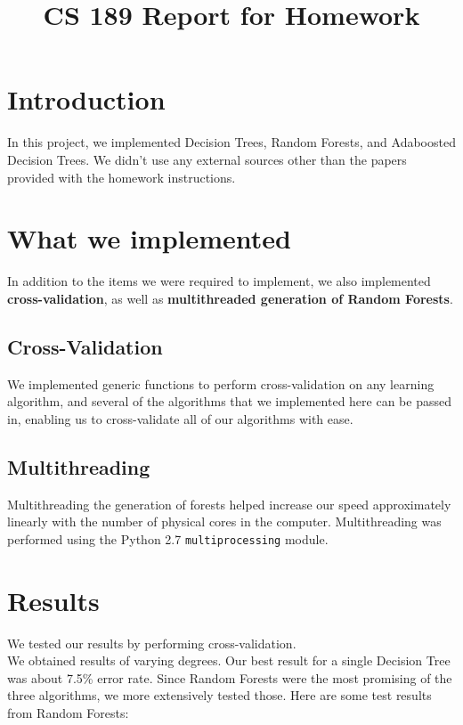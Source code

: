 \documentclass[11pt]{article}
\title{CS 189 Report for Homework \Homework}
\author{\Name}
\begin{document}
\maketitle

\section{Introduction}

In this project, we implemented Decision Trees, Random Forests, and Adaboosted Decision Trees. We didn't use any external sources other than the papers provided with the homework instructions. 

\section{What we implemented}

In addition to the items we were required to implement, we also implemented \textbf{cross-validation}, as well as \textbf{multithreaded generation of Random Forests}. 

\subsection{Cross-Validation}
We implemented generic functions to perform cross-validation on any learning algorithm, and several of the algorithms that we implemented here can be passed in, enabling us to cross-validate all of our algorithms with ease. 

\subsection{Multithreading}
Multithreading the generation of forests helped increase our speed approximately linearly with the number of physical cores in the computer. Multithreading was performed using the Python 2.7 \texttt{multiprocessing} module. 

\section{Results}

We tested our results by performing cross-validation. \\

We obtained results of varying degrees. Our best result for a single Decision Tree was about 7.5\% error rate. Since Random Forests were the most promising of the three algorithms, we more extensively tested those. Here are some test results from Random Forests:
\end{document}
